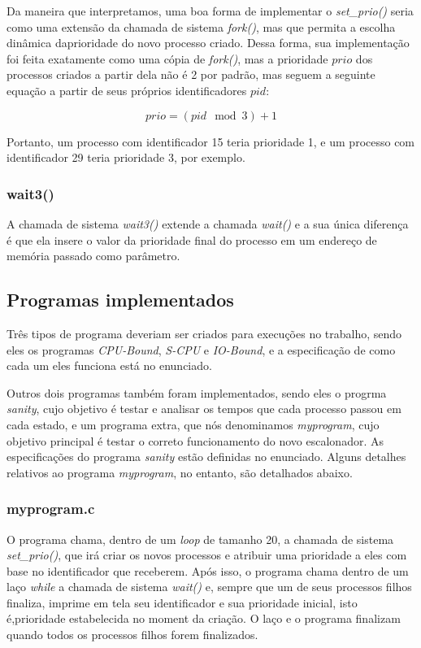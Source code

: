 \documentclass{article}
\begin{document}
Da maneira que interpretamos, uma boa forma de implementar o
\textit{set\_prio()} seria como uma extensão da chamada de sistema
\textit{fork()}, mas que permita a escolha dinâmica daprioridade do novo
processo criado. Dessa forma, sua implementação foi feita exatamente como uma
cópia de \textit{fork()}, mas a prioridade \(prio\) dos processos criados a
partir dela
não é 2 por padrão, mas seguem a seguinte equação a partir de seus próprios
identificadores \(pid\):

\[prio = (pid \mod 3) + 1\]

Portanto, um processo com identificador 15 teria prioridade 1, e um processo
com identificador 29 teria prioridade 3, por exemplo.

\subsubsection{wait3()}

A chamada de sistema \textit{wait3()} extende a chamada \textit{wait()} e a sua
única diferença é que ela insere o valor da prioridade final do processo em
um endereço de memória passado como parâmetro.

\subsection{Programas implementados}

Três tipos de programa deveriam ser criados para execuções no trabalho, sendo
eles
os programas \textit{CPU-Bound}, \textit{S-CPU} e \textit{IO-Bound}, e a
especificação de como cada um eles funciona está no enunciado.

Outros dois programas também foram implementados, sendo eles o progrma
\textit{sanity}, cujo objetivo é testar e analisar os tempos que cada processo
passou em cada estado, e um programa extra, que nós denominamos
\textit{myprogram}, cujo objetivo principal é testar o correto funcionamento do
novo escalonador. As especificações do programa \textit{sanity} estão definidas
no enunciado. Alguns detalhes relativos ao programa
\textit{myprogram}, no entanto, são detalhados abaixo.

\subsubsection{myprogram.c}

O programa chama, dentro de um \textit{loop} de tamanho 20, a chamada de
sistema \textit{set\_prio()}, que irá criar os novos processos e atribuir uma
prioridade a eles com base no identificador que receberem.
Após isso, o programa chama dentro de um laço \textit{while} a chamada de
sistema \textit{wait()} e, sempre que um de seus processos filhos finaliza,
imprime em tela seu identificador e sua prioridade inicial, isto é,prioridade
estabelecida no moment da criação.
O laço e o programa finalizam quando todos os processos filhos forem
finalizados.
\end{document}
